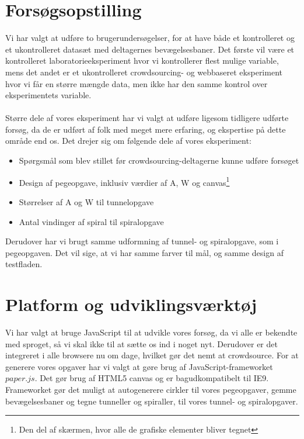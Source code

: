 \section*{Forsøgsopstilling}
Vi har valgt at udføre to brugerundersøgelser, for at have både et kontrolleret og et ukontrolleret datasæt med deltagernes bevægelsesbaner.
Det første vil være et kontrolleret laboratorieeksperiment hvor vi kontrollerer flest mulige variable, mens det andet er et ukontrolleret crowdsourcing- og webbaseret eksperiment hvor vi får en større mængde data, men ikke har den samme kontrol over eksperimentets variable.\\\\
Større dele af vores eksperiment har vi valgt at udføre ligesom tidligere udførte forsøg, da de er udført af folk med meget mere erfaring, og ekspertise på dette område end os.
Det drejer sig om følgende dele af vores eksperiment:
\begin{itemize}
\item Spørgsmål som blev stillet før crowdsourcing-deltagerne kunne udføre forsøget \cite{goldberg2015}
\item Design af pegeopgave, inklusiv værdier af A, W og canvas\footnote{Den del af skærmen, hvor alle de grafiske elementer bliver tegnet} \cite{goldberg2015}
\item Størrelser af A og W til tunnelopgave \cite{accot1997}
\item Antal vindinger af spiral til spiralopgave \cite{accot1997}
\end{itemize}
Derudover har vi brugt samme udformning af tunnel- og spiralopgave, som i pegeopgaven. Det vil sige, at vi har samme farver til mål, og samme design af testfladen.

\section*{Platform og udviklingsværktøj}
Vi har valgt at bruge JavaScript til at udvikle vores forsøg, da vi alle er bekendte med sproget, så vi skal ikke til at sætte os ind i noget nyt. Derudover er det integreret i alle browsere nu om dage, hvilket gør det nemt at crowdsource. For at generere vores opgaver har vi valgt at gøre brug af JavaScript-frameworket $paper.js$. Det gør brug af HTML5 canvas og er bagudkompatibelt til IE9. Frameworket gør det muligt at autogenerere cirkler til vores pegeopgaver, gemme bevægelsesbaner og tegne tunneller og spiraller, til vores tunnel- og spiralopgaver.

